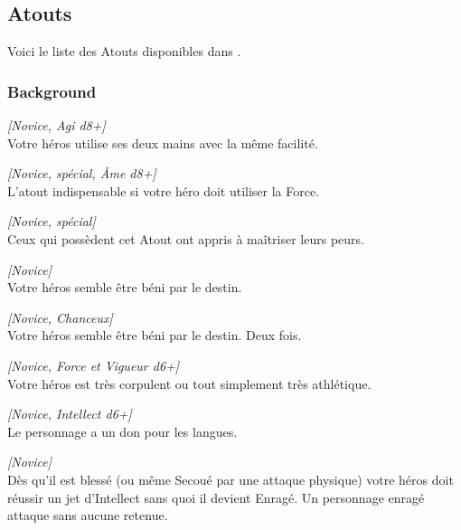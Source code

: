 \subsection{Atouts}

Voici le liste des Atouts disponibles dans \swfe.

\subsubsection{Background}
\begin{description}[align=left]
    \item [Ambidextre]
    	\emph{[Novice, Agi d8+]}\\
        Votre héros utilise ses deux mains avec la même facilité.

    \item [Arcane (Force)]
    	\emph{[Novice, spécial, \^Ame d8+]}\\
        L'atout indispensable si votre héro doit utiliser la Force.

    \item [Brave]
    	\emph{[Novice, spécial]}\\
        Ceux qui possèdent cet Atout ont appris à maîtriser leurs peurs.

    \item [Chanceux]
    	\emph{[Novice]}\\
        Votre héros semble être béni par le destin.

    \item [Très Chanceux]
    	\emph{[Novice, Chanceux]}\\
        Votre héros semble être béni par le destin. Deux fois.

    \item [Costaud]
    	\emph{[Novice, Force et Vigueur d6+]}\\
        Votre héros est très corpulent ou tout simplement très athlétique.

    \item [Don des langues]
    	\emph{[Novice, Intellect d6+]}\\
        Le personnage a un don pour les langues.

    \item [Enragé]
    	\emph{[Novice]}\\
        Dès qu’il est blessé (ou même Secoué par une attaque physique) votre héros doit réussir un jet d’Intellect sans quoi il devient Enragé. Un personnage enragé attaque sans aucune retenue.


\end{description}
